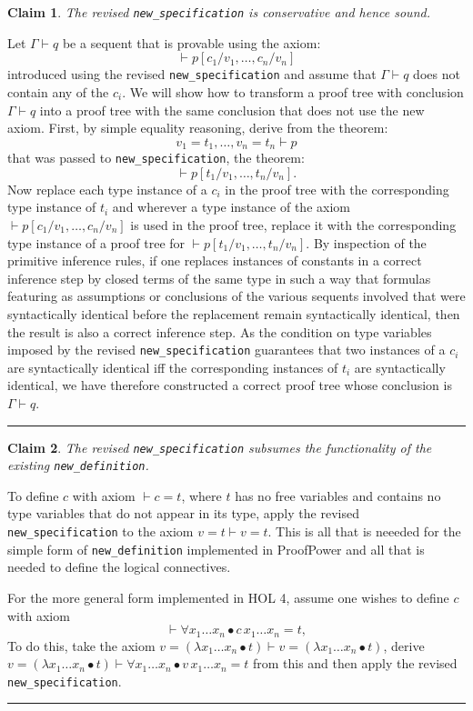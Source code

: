 \documentclass[12pt]{article}
\def\NewDefn{{\tt new\_definition}}
\def\NewSpec{{\tt new\_specification}}
\def\Done{\hfill\rule{0.5em}{0.5em}}
\newtheorem{Claim}{Claim}
\begin{document}
\begin{Claim}\label{clm:conservative}
The revised {\NewSpec} is conservative and hence sound. 
\end{Claim}
Let $\Gamma \vdash q$ be a sequent that is provable using
the axiom:
$$\vdash p[c_1/v_1, \ldots, c_n/v_n]
$$
introduced using the revised {\NewSpec}
and assume that $\Gamma \vdash q$ does not contain any of the $c_i$.
We will show how to transform a proof tree with conclusion $\Gamma \vdash q$ into
a proof tree with the same conclusion that does not use the new axiom.
First, by simple equality reasoning, derive from the theorem:
$$
v_1 = t_1, \ldots, v_n = t_n \vdash p
$$
\noindent that was passed to {\NewSpec},
the theorem:
$$
\vdash p[t_1/v_1, \ldots, t_n/v_n].
$$
\noindent Now replace each type instance of a $c_i$ in the proof tree with the corresponding type instance
of $t_i$ and wherever a type instance of the axiom 
$\vdash p[c_1/v_1, \ldots, c_n/v_n]$ is used in the proof tree, replace it with the
corresponding type instance of a proof tree for $\vdash p[t_1/v_1, \ldots, t_n/v_n]$.
By inspection of the primitive inference rules, if one replaces instances of constants in a correct inference step by closed terms of the same type in such a way that formulas featuring as assumptions or conclusions of the various sequents involved that were syntactically identical before the replacement remain syntactically identical, then the result is also a correct inference step.
As the condition on type variables imposed by the revised
{\NewSpec} guarantees that two instances of a $c_i$ are syntactically identical iff the corresponding instances
of $t_i$ are syntactically identical, we have therefore constructed a correct proof tree whose conclusion is $\Gamma \vdash q$.
\Done

\begin{Claim}\label{clm:new-defn}
The revised {\NewSpec} subsumes the functionality of the existing {\NewDefn}.
\end{Claim}
To define $c$ with axiom $\vdash c = t$, where $t$ has no free variables and contains no type variables that do not appear in its type, apply the revised {\NewSpec}
to the axiom $v = t \vdash v = t$. This is all that is neeeded for the simple form of {\NewDefn} implemented in {\sf ProofPower} and all that is needed to define the logical connectives.

For the more general form implemented in HOL 4, assume one wishes
to define $c$ with axiom
$$
\vdash \forall x_1 \ldots x_n\bullet c\,x_1\ldots x_n = t,
$$
\noindent To do this, take the axiom $v = (\lambda x_1 \ldots x_n\bullet t) \vdash v = (\lambda x_1 \ldots x_n\bullet t)$,
derive $v = (\lambda x_1 \ldots x_n\bullet t) \vdash \forall x_1 \ldots x_n\bullet v\,x_1\ldots x_n = t$
from this and then apply the revised {\NewSpec}. \Done
\end{document}
